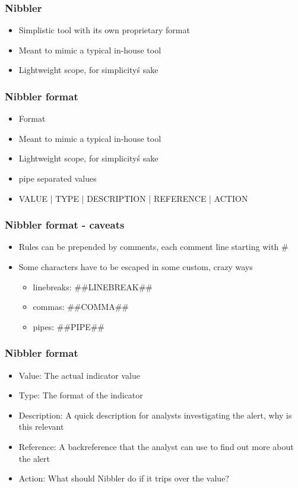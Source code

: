 \begin{frame}
  \frametitle{Nibbler}
  \begin{itemize}
    \item Simplistic tool with its own proprietary format
    \item Meant to mimic a typical in-house tool
    \item Lightweight scope, for simplicity\'s sake
  \end{itemize}
\end{frame}

\begin{frame}
  \frametitle{Nibbler format}
  \begin{itemize}
    \item Format
    \item Meant to mimic a typical in-house tool
    \item Lightweight scope, for simplicity\'s sake
    \item pipe separated values
    \item VALUE | TYPE | DESCRIPTION | REFERENCE | ACTION
  \end{itemize}
\end{frame}

\begin{frame}
  \frametitle{Nibbler format - caveats}
  \begin{itemize}
    \item Rules can be prepended by comments, each comment line starting with \#
    \item Some characters have to be escaped in some custom, crazy ways
    \begin{itemize}
       \item linebreaks: \#\#LINEBREAK\#\#
       \item commas: \#\#COMMA\#\#
       \item pipes: \#\#PIPE\#\#
    \end{itemize}
  \end{itemize}
\end{frame}

\begin{frame}
  \frametitle{Nibbler format}
  \begin{itemize}
    \item Value: The actual indicator value
    \item Type: The format of the indicator
    \item Description: A quick description for analysts investigating the alert, why is this relevant
    \item Reference: A backreference that the analyst can use to find out more about the alert
    \item Action: What should Nibbler do if it trips over the value?
  \end{itemize}
\end{frame}

